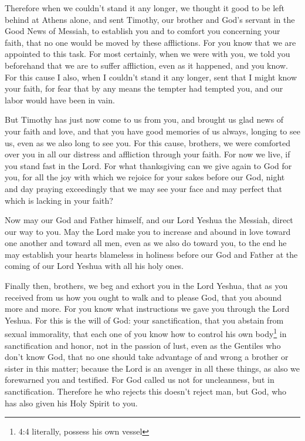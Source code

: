 \mychapter{} \myverse*{}Therefore when we couldn’t stand it any longer, we thought it good
to be left behind at Athens alone,
\myverse{}and sent Timothy, our brother and God’s servant in the Good News of Messiah,
to establish you and to comfort you concerning your faith,
\myverse{}that no one would be moved by these afflictions. For you know that we are appointed
to this task.
\myverse{}For most certainly, when we were with you, we told you beforehand that we are
to suffer affliction, even as it happened, and you know.
\myverse{}For this cause I also, when I couldn’t stand it any longer, sent that I might
know your faith, for fear that by any means the tempter had tempted you, and our labor would have been
in vain.

\myverse{}But Timothy has just now come to us from you, and brought us glad
news of your faith and love, and that you have good memories of us always, longing to see us, even as
we also long to see you.
\myverse{}For this cause, brothers, we were comforted over you in all our distress and
affliction through your faith.
\myverse{}For now we live, if you stand fast in the Lord.
\myverse{}For what thanksgiving can we give again to God for you, for all the joy with
which we rejoice for your sakes before our God,
\myverse{}night and day praying exceedingly that we may see your face and may perfect
that which is lacking in your faith?

\myverse{}Now may our God and Father himself, and our Lord Yeshua the Messiah,
direct our way to you.
\myverse{}May the Lord make you to increase and abound in love toward one another and
toward all men, even as we also do toward you,
\myverse{}to the end he may establish your hearts blameless in holiness before our God
and Father at the coming of our Lord Yeshua with all his holy ones.


\mychapter{} \myverse*{}Finally then, brothers, we beg and exhort you in the Lord Yeshua,
that as you received from us how you ought to walk and to please God, that you abound more and more.
\myverse{}For you know what instructions we gave you through the Lord Yeshua.
\myverse{}For this is the will of God: your sanctification, that you abstain from sexual
immorality,
\myverse{}that each one of you know how to control his own body\footnote{4:4 literally, possess his own vessel} in sanctification and honor,
\myverse{}not in the passion of lust, even as the Gentiles who don’t know God,
\myverse{}that no one should take advantage of and wrong a brother or sister in this matter;
because the Lord is an avenger in all these things, as also we forewarned you and testified.
\myverse{}For God called us not for uncleanness, but in sanctification.
\myverse{}Therefore he who rejects this doesn’t reject man, but God, who has also given
his Holy Spirit to you.

